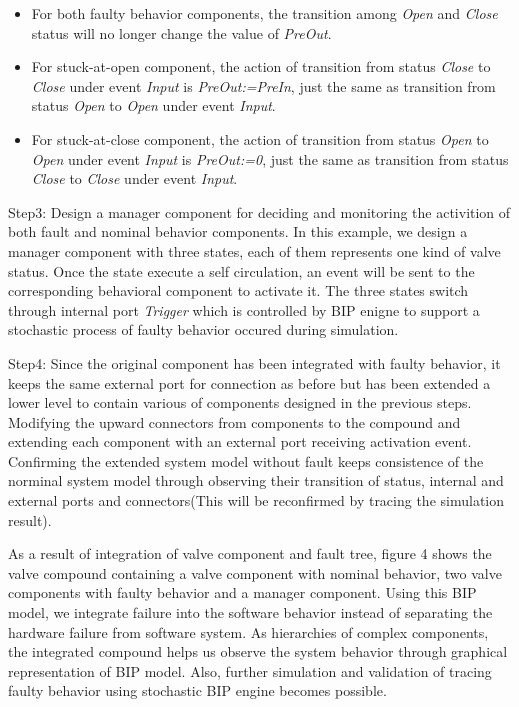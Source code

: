 \begin{itemize}
	\item For both faulty behavior components, the transition among \emph{Open} and \emph{Close} status will no longer change the value of \emph{PreOut}.
	\item For stuck-at-open component, the action of transition from status \emph{Close} to \emph{Close} under event \emph{Input} is \emph{PreOut:=PreIn}, just the same as transition from status \emph{Open} to \emph{Open} under event \emph{Input}.
	\item For stuck-at-close component, the action of transition from status \emph{Open} to \emph{Open} under event \emph{Input} is \emph{PreOut:=0}, just the same as transition from status \emph{Close} to \emph{Close} under event \emph{Input}.
\end{itemize}

Step3: Design a manager component for deciding and monitoring the activition of both fault and nominal behavior components. In this example, we design a manager component with three states, each of them represents one kind of valve status. Once the state execute a self circulation, an event will be sent to the corresponding behavioral component to activate it. The three states switch through internal port \emph{Trigger} which is controlled by BIP enigne to support a stochastic process of faulty behavior occured during simulation.

Step4: Since the original component has been integrated with faulty behavior, it keeps the same external port for connection  as before but has been extended a lower level to contain various of components designed in the previous steps. Modifying the upward connectors from components to the compound and extending each component with an external port receiving activation event. Confirming the extended system model without fault keeps consistence of the norminal system model through observing their transition of status, internal and external ports and connectors(This will be reconfirmed by tracing the simulation result).

As a result of integration of valve component and fault tree, figure 4 shows the valve compound containing a valve component with nominal behavior, two valve components with faulty behavior and a manager component. Using this BIP model, we integrate failure into the software behavior instead of separating the hardware failure from software system. As hierarchies of complex components, the integrated compound helps us observe the system behavior through graphical representation of BIP model. Also, further simulation and validation of tracing faulty behavior using stochastic BIP engine becomes possible.

